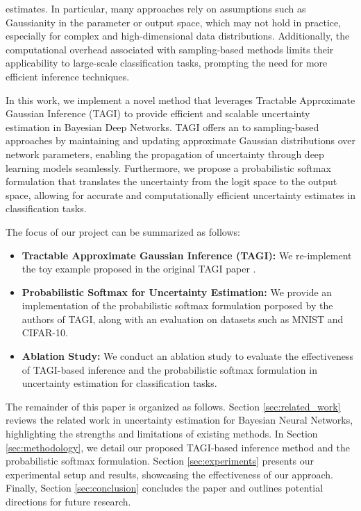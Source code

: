 \documentclass{article}
\begin{document}
estimates. In particular, many approaches rely on assumptions such as Gaussianity in the parameter or output space, which may not hold in practice, especially for complex and high-dimensional data distributions. Additionally, the computational overhead associated with sampling-based methods limits their applicability to large-scale classification tasks, prompting the need for more efficient inference techniques.

In this work, we implement a novel method that leverages Tractable Approximate Gaussian Inference (TAGI) to provide efficient and scalable uncertainty estimation in Bayesian Deep Networks. TAGI offers an to sampling-based approaches by maintaining and updating approximate Gaussian distributions over network parameters, enabling the propagation of uncertainty through deep learning models seamlessly. Furthermore, we propose a probabilistic softmax formulation that translates the uncertainty from the logit space to the output space, allowing for accurate and computationally efficient uncertainty estimates in classification tasks.

The focus of our project can be summarized as follows:

\begin{itemize}
    \item \textbf{Tractable Approximate Gaussian Inference (TAGI):} We re-implement the toy example proposed in the original TAGI paper \cite{goulet2020tractable}.
    \item \textbf{Probabilistic Softmax for Uncertainty Estimation:} We provide an implementation of the probabilistic softmax formulation porposed by the authors of TAGI, along with an evaluation on datasets such as MNIST and CIFAR-10.
    \item \textbf{Ablation Study:} We conduct an ablation study to evaluate the effectiveness of TAGI-based inference and the probabilistic softmax formulation in uncertainty estimation for classification tasks.
\end{itemize}

The remainder of this paper is organized as follows. Section \ref{sec:related_work} reviews the related work in uncertainty estimation for Bayesian Neural Networks, highlighting the strengths and limitations of existing methods. In Section \ref{sec:methodology}, we detail our proposed TAGI-based inference method and the probabilistic softmax formulation. Section \ref{sec:experiments} presents our experimental setup and results, showcasing the effectiveness of our approach. Finally, Section \ref{sec:conclusion} concludes the paper and outlines potential directions for future research.
\end{document}
